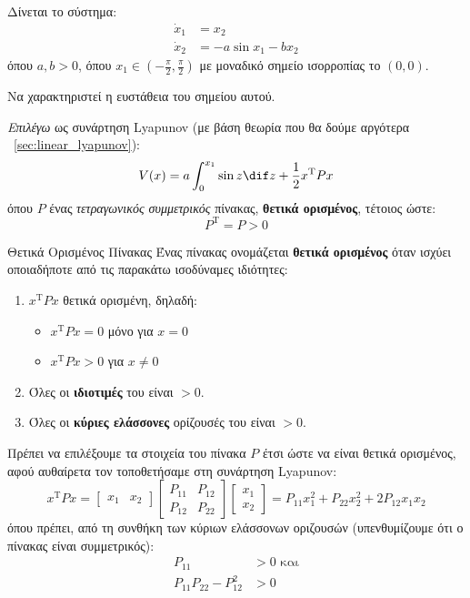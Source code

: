 \documentclass[11pt,a4paper,notitlepage,fleqn]{article}
\begin{document}
\begin{exercise}
	Δίνεται το σύστημα:
	\begin{align}
		\dot x_1 &= x_2 \label{sec1ex2m1} \\
		\dot x_2 &= -a\sin  x_1 - bx_2 \label{sec1ex2m2}
	\end{align}
	όπου \( a,b > 0 \), όπου \( x_1 \in \left(-\frac{π}{2},\frac{π}{2}\right) \) με μοναδικό σημείο ισορροπίας το \( (0,0) \).

	Να χαρακτηριστεί η ευστάθεια του σημείου αυτού.

	\tcblower

	\textit{Επιλέγω} ως συνάρτηση Lyapunov (με βάση θεωρία που θα δούμε αργότερα \textemdash~\autoref{sec:linear_lyapunov}):
	\[
	V(x) = a\int_{0}^{x_1} \sin z \dif z + \frac{1}{2} x^{\mathrm T} Px
	\]
	όπου \( P \) ένας \textit{τετραγωνικός συμμετρικός} πίνακας, \textbf{θετικά
	ορισμένος}, τέτοιος ώστε:
	\[
	P^{\mathrm T} = P > 0
	\]
	\begin{infobox}{Θετικά Ορισμένος Πίνακας}
		Ένας πίνακας ονομάζεται \textbf{θετικά ορισμένος} όταν ισχύει οποιαδήποτε
		από τις παρακάτω ισοδύναμες ιδιότητες:
		\begin{enumerate}
			\item \( x^{\mathrm T} P x \) θετικά ορισμένη, δηλαδή: \begin{itemize}
				\item \( x^{\mathrm T} P x = 0 \) μόνο για \( x = 0 \)
				\item \( x^{\mathrm T} P x > 0 \) για \( x \neq 0 \)
			\end{itemize}
			\item Όλες οι \textbf{ιδιοτιμές} του είναι \( >0 \).
			\item Όλες οι \textbf{κύριες ελάσσονες} ορίζουσές του είναι \( >0 \).
		\end{enumerate}
	\end{infobox}

	Πρέπει να επιλέξουμε τα στοιχεία του πίνακα \( P \) έτσι ώστε να είναι θετικά
	ορισμένος, αφού αυθαίρετα τον τοποθετήσαμε στη συνάρτηση Lyapunov:
	\[
	x^{\mathrm T} P x = \left[\begin{matrix}
	x_1 & x_2
	\end{matrix}\right]\left[
	\begin{matrix}
	P_{11} & P_{12} \\ P_{12} & P_{22}
	\end{matrix}
	\right] \left[
	\begin{matrix}
	x_1 \\ x_2
	\end{matrix}
	\right]= P_{11} x_1^2 + P_{22}x_2^2 + 2P_{12}x_1x_2
	\]
	όπου πρέπει, από τη συνθήκη των κύριων ελάσσονων οριζουσών (υπενθυμίζουμε ότι ο πίνακας είναι συμμετρικός):
	\begin{align*}
		P_{11} &> 0 \text{ και} \\ P_{11}P_{22} - P_{12}^2 &> 0
	\end{align*}


\end{exercise}
\end{document}
